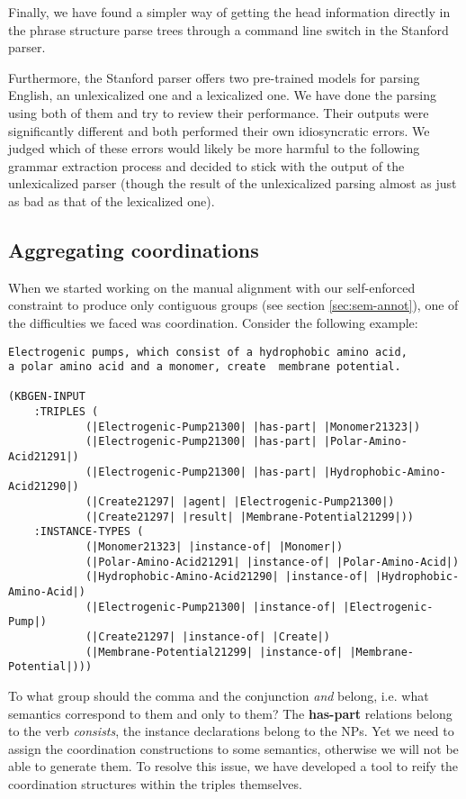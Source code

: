 \documentclass[a4paper]{article}
\begin{document}
Finally, we have found a simpler way of getting the head information
directly in the phrase structure parse trees through a command line
switch in the Stanford parser.


Furthermore, the Stanford parser offers two pre-trained models for
parsing English, an unlexicalized one and a lexicalized one. We have
done the parsing using both of them and try to review their
performance. Their outputs were significantly different and both
performed their own idiosyncratic errors. We judged which of these
errors would likely be more harmful to the following grammar
extraction process and decided to stick with the output of the
unlexicalized parser (though the result of the unlexicalized parsing
almost as just as bad as that of the lexicalized one).

\subsection{Aggregating coordinations}
\label{ssec:coord}

When we started working on the manual alignment with our self-enforced
constraint to produce only contiguous groups (see section
\ref{sec:sem-annot}), one of the difficulties we faced was
coordination. Consider the following example:

\begin{verbatim}
Electrogenic pumps, which consist of a hydrophobic amino acid,
a polar amino acid and a monomer, create  membrane potential.

(KBGEN-INPUT 
    :TRIPLES (
            (|Electrogenic-Pump21300| |has-part| |Monomer21323|)
            (|Electrogenic-Pump21300| |has-part| |Polar-Amino-Acid21291|)
            (|Electrogenic-Pump21300| |has-part| |Hydrophobic-Amino-Acid21290|)
            (|Create21297| |agent| |Electrogenic-Pump21300|)
            (|Create21297| |result| |Membrane-Potential21299|))
    :INSTANCE-TYPES (
            (|Monomer21323| |instance-of| |Monomer|)
            (|Polar-Amino-Acid21291| |instance-of| |Polar-Amino-Acid|)
            (|Hydrophobic-Amino-Acid21290| |instance-of| |Hydrophobic-Amino-Acid|)
            (|Electrogenic-Pump21300| |instance-of| |Electrogenic-Pump|)
            (|Create21297| |instance-of| |Create|)
            (|Membrane-Potential21299| |instance-of| |Membrane-Potential|)))
\end{verbatim}

To what group should the comma and the conjunction \emph{and} belong,
i.e. what semantics correspond to them and only to them? The
\textbf{has-part} relations belong to the verb \emph{consists}, the
instance declarations belong to the NPs. Yet we need to assign the
coordination constructions to some semantics, otherwise we will not be
able to generate them. To resolve this issue, we have developed a tool
to reify the coordination structures within the triples themselves.
\end{document}
